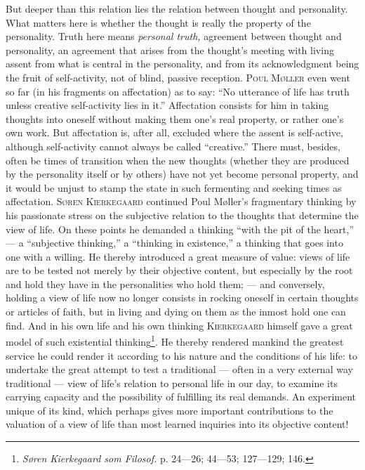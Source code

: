 \documentclass[12pt,a4paper,openany]{book}
\newcommand{\opage}[1]{\marginnote{\footnotesize\textit{[#1]}}}
\begin{document}
But deeper than this relation lies the relation between
\opage{253}thought and personality. What matters here is whether the thought is really the property of the personality.
Truth here means \textit{personal truth,} agreement between thought and personality, an agreement that arises from the
thought's meeting with living assent from what is central in the personality, and from its acknowledgment being the
fruit of self-activity, not of blind, passive reception. \textsc{Poul Møller} even went so far (in his fragments on
affectation) as to say: ``No utterance of life has truth unless creative self-activity lies in it.'' Affectation
consists for him in taking thoughts into oneself without making them one's real property, or rather one's own work. But
affectation is, after all, excluded where the assent is self-active, although self-activity cannot always be called
``creative.'' There must, besides, often be times of transition when the new thoughts (whether they are produced by the
personality itself or by others) have not yet become personal property, and it would be unjust to stamp the state in
such fermenting and seeking times as affectation. \textsc{Søren Kierkegaard} continued Poul Møller's fragmentary
thinking by his passionate stress on the subjective relation to the thoughts that determine the view of life. On these
points he demanded a thinking ``with the pit of the heart,'' --- a ``subjective thinking,'' a ``thinking in
existence,'' a thinking that goes into one with a willing. He thereby introduced a great measure of value: views of life
are to be tested not merely by their objective content, but especially by the root and hold they have in the
personalities who hold them; --- and conversely, holding a view of life now no longer consists in rocking oneself in
certain thoughts or articles of faith, but in living and dying on them as the inmost hold one can find. And in his own
life and his own thinking \textsc{Kierkegaard} himself gave a great model of such existential
thinking\footnote[1]{\textit{Søren Kierkegaard som Filosof.} p. 24---26; 44---53; 127---129; 146.}. He thereby rendered
mankind the greatest service he could render it according to his nature and the conditions of his life: to undertake
the great attempt to test a traditional --- often in a very external way
\opage{254}traditional --- view of life's relation to personal life in our day, to examine its carrying capacity and the
possibility of fulfilling its real demands. An experiment unique of its kind, which perhaps gives more important
contributions to the valuation of a view of life than most learned inquiries into its objective content!
\end{document}
